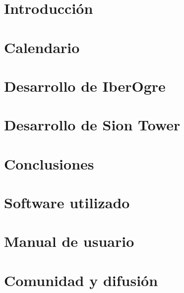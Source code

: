 \documentclass[a4paper,11pt]{book}
\begin{document}
\renewcommand{\figurename}{Figura}
\renewcommand{\listfigurename}{Indice de figuras}
\renewcommand{\tablename}{Tabla}
\renewcommand{\listtablename}{Indice de tablas}

\pagestyle{empty}

\cleardoublepage


\cleardoublepage
\pagestyle{plain}

\frontmatter %


\cleardoublepage

\tableofcontents
\listoffigures
\listoftables

\mainmatter %

\chapter{Introducción}


\chapter{Calendario}


\chapter{Desarrollo de IberOgre}


\chapter{Desarrollo de Sion Tower}


\chapter{Conclusiones}



\backmatter %


\clearpage

\chapter*{Software utilizado}


\chapter*{Manual de usuario}


\chapter*{Comunidad y difusión}






\end{document}
